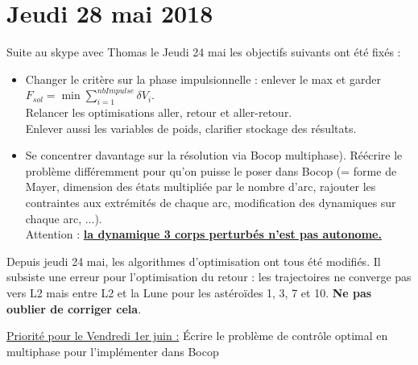 \documentclass[fleqn,%
a4paper,11pt]{scrbook}
\begin{document}
\section*{Jeudi 28 mai 2018}
	Suite au skype avec Thomas le Jeudi 24 mai les objectifs suivants ont 		été fixés :
	\begin{itemize}
		\item Changer le critère sur la phase impulsionnelle : enlever le 	max et garder $F_{sol} = \min \sum_{i=1}^{nbImpulse} \delta V_i$. \\
		Relancer les optimisations aller, retour et aller-retour. \\
		Enlever aussi les variables de poids, clarifier stockage des résultats.
		
		\item Se concentrer davantage sur la résolution via Bocop multiphase).
		Réécrire le problème différemment pour qu'on puisse le poser dans Bocop (= forme de Mayer, dimension des 	états multipliée par le nombre d'arc, rajouter les contraintes 	aux extrémités de chaque arc, modification des dynamiques sur chaque arc, ...). \\
		Attention : \underline{\textbf{la dynamique 3 corps perturbés n'est pas autonome.}}
	\end{itemize}
	
	Depuis jeudi 24 mai, les algorithmes d'optimisation ont tous été modifiés. Il subsiste une erreur pour l'optimisation du retour : les trajectoires ne converge pas vers L2 mais entre L2 et la Lune pour les astéroïdes 1, 3, 7 et 10. \textbf{Ne pas oublier de corriger cela}.
	
	\underline{Priorité pour le Vendredi 1er juin :} Écrire le problème de contrôle optimal en multiphase pour l'implémenter dans Bocop
\end{document}
